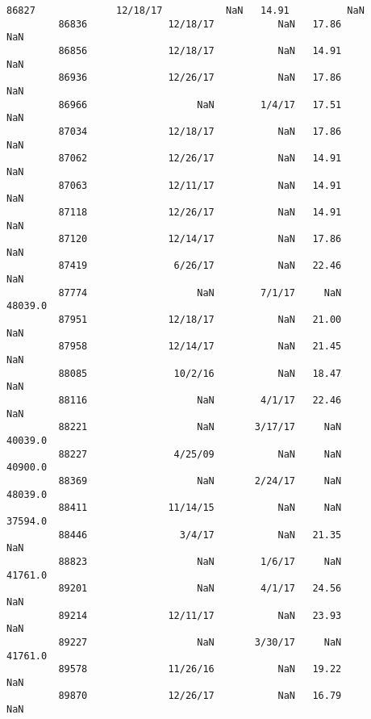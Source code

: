 \documentclass[11pt]{article}
\begin{document}
\begin{Verbatim}[commandchars=\\\{\}]
         86827              12/18/17           NaN   14.91          NaN   
         86836              12/18/17           NaN   17.86          NaN   
         86856              12/18/17           NaN   14.91          NaN   
         86936              12/26/17           NaN   17.86          NaN   
         86966                   NaN        1/4/17   17.51          NaN   
         87034              12/18/17           NaN   17.86          NaN   
         87062              12/26/17           NaN   14.91          NaN   
         87063              12/11/17           NaN   14.91          NaN   
         87118              12/26/17           NaN   14.91          NaN   
         87120              12/14/17           NaN   17.86          NaN   
         87419               6/26/17           NaN   22.46          NaN   
         87774                   NaN        7/1/17     NaN      48039.0   
         87951              12/18/17           NaN   21.00          NaN   
         87958              12/14/17           NaN   21.45          NaN   
         88085               10/2/16           NaN   18.47          NaN   
         88116                   NaN        4/1/17   22.46          NaN   
         88221                   NaN       3/17/17     NaN      40039.0   
         88227               4/25/09           NaN     NaN      40900.0   
         88369                   NaN       2/24/17     NaN      48039.0   
         88411              11/14/15           NaN     NaN      37594.0   
         88446                3/4/17           NaN   21.35          NaN   
         88823                   NaN        1/6/17     NaN      41761.0   
         89201                   NaN        4/1/17   24.56          NaN   
         89214              12/11/17           NaN   23.93          NaN   
         89227                   NaN       3/30/17     NaN      41761.0   
         89578              11/26/16           NaN   19.22          NaN   
         89870              12/26/17           NaN   16.79          NaN   
         

\end{Verbatim}
\end{document}
